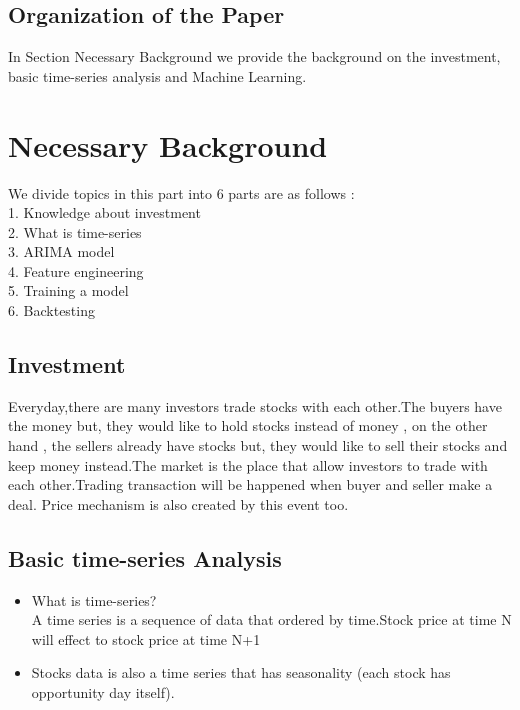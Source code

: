 \documentclass{article}
\begin{document}
\subsection{Organization of the Paper}

In Section Necessary Background we provide the background on the investment, basic time-series analysis and Machine Learning.



\section{Necessary Background}
\label{sec:background}


We divide topics in this part into 6 parts are as follows :\\
1. Knowledge about investment\\
2. What is time-series\\
3. ARIMA model\\
4. Feature engineering\\
5. Training a model\\
6. Backtesting


\subsection{Investment}
Everyday,there are many investors trade stocks with each other.The buyers have the money but, they would like to hold stocks instead of money , on the other hand , the sellers already have stocks but, they would like to sell their stocks and keep money instead.The market is the place that allow investors to trade with each other.Trading transaction will be happened when buyer and seller make a deal.
Price mechanism is also created by this event too.

\subsection{Basic time-series Analysis}
\begin{itemize}
\item What is time-series?\\A time series is a sequence of data that ordered by time.Stock price at time N will 
effect to stock price at time N+1
\item Stocks data is also a time series that has seasonality (each stock has opportunity day itself).
\end{itemize}
\end{document}
